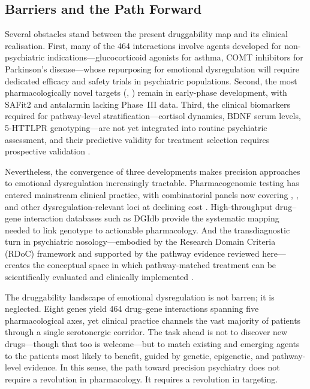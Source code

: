 \subsection*{Barriers and the Path Forward}

Several obstacles stand between the present druggability map and its clinical
realisation. First, many of the 464 interactions involve agents developed for
non-psychiatric indications---glucocorticoid agonists for asthma, COMT
inhibitors for Parkinson's disease---whose repurposing for emotional
dysregulation will require dedicated efficacy and safety trials in psychiatric
populations. Second, the most pharmacologically novel targets (,
) remain in early-phase development, with SAFit2 and antalarmin
lacking Phase~III data. Third, the clinical biomarkers required for
pathway-level stratification---cortisol dynamics, BDNF serum levels, 5-HTTLPR
genotyping---are not yet integrated into routine psychiatric assessment, and
their predictive validity for treatment selection requires prospective
validation \cite{bradley2020}.

Nevertheless, the convergence of three developments makes precision approaches
to emotional dysregulation increasingly tractable. Pharmacogenomic testing has
entered mainstream clinical practice, with combinatorial panels now covering
, , and other dysregulation-relevant loci at declining
cost \cite{bousman2023}. High-throughput drug--gene interaction databases such
as DGIdb provide the systematic mapping needed to link genotype to actionable
pharmacology. And the transdiagnostic turn in psychiatric nosology---embodied
by the Research Domain Criteria (RDoC) framework and supported by the pathway
evidence reviewed here---creates the conceptual space in which pathway-matched
treatment can be scientifically evaluated and clinically implemented
\cite{insel2010}.

The druggability landscape of emotional dysregulation is not barren; it is
neglected. Eight genes yield 464 drug--gene interactions spanning five
pharmacological axes, yet clinical practice channels the vast majority of
patients through a single serotonergic corridor. The task ahead is not to
discover new drugs---though that too is welcome---but to match existing and
emerging agents to the patients most likely to benefit, guided by genetic,
epigenetic, and pathway-level evidence. In this sense, the path toward
precision psychiatry does not require a revolution in pharmacology. It requires
a revolution in targeting.
